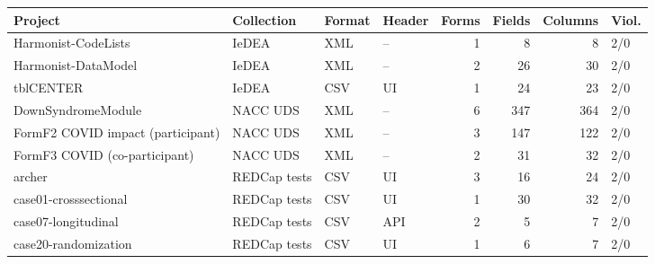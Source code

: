 \begin{tabular}{@{}llllrrrl@{}}
\toprule
Project & Collection & Format & Header & Forms & Fields & Columns & Viol. \\
\midrule
Harmonist-CodeLists & IeDEA & XML & -- & 1 & 8 & 8 & 2/0 \\
Harmonist-DataModel & IeDEA & XML & -- & 2 & 26 & 30 & 2/0 \\
tblCENTER & IeDEA & CSV & UI & 1 & 24 & 23 & 2/0 \\
DownSyndromeModule & NACC UDS & XML & -- & 6 & 347 & 364 & 2/0 \\
FormF2 COVID impact (participant) & NACC UDS & XML & -- & 3 & 147 & 122 & 2/0 \\
FormF3 COVID (co-participant) & NACC UDS & XML & -- & 2 & 31 & 32 & 2/0 \\
archer & REDCap tests & CSV & UI & 3 & 16 & 24 & 2/0 \\
case01-crosssectional & REDCap tests & CSV & UI & 1 & 30 & 32 & 2/0 \\
case07-longitudinal & REDCap tests & CSV & API & 2 & 5 & 7 & 2/0 \\
case20-randomization & REDCap tests & CSV & UI & 1 & 6 & 7 & 2/0 \\
\bottomrule
\end{tabular}

